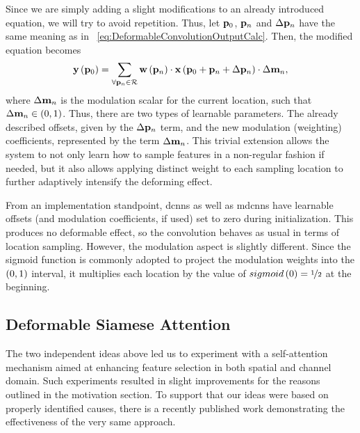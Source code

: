 Since we are simply adding a slight modifications to an already introduced equation, we will try to avoid repetition. Thus, let $\mathbf{p}_0$, $\mathbf{p}_n$ and $\Delta \mathbf{p}_n$ have the same meaning as in \eqtext{}~\ref{eq:DeformableConvolutionOutputCalc}. Then, the modified equation becomes
\begin{equation}
    \label{eq:ModulatedDeformableConvolutionOutputCalc}
    {\mathbf{y}} \left( \mathbf{p}_0 \right) =
    \sum_{\forall \mathbf{p}_n \in \mathcal{R}}
    {\mathbf{w}} \left( \mathbf{p}_n \right) \cdot {\mathbf{x}} \left( \mathbf{p}_0 + \mathbf{p}_n + \Delta \mathbf{p}_n \right) \cdot \Delta \mathbf{m}_n,
\end{equation}
where $\Delta \mathbf{m}_n$ is the modulation scalar for the current location, such that $\Delta \mathbf{m}_n \in \left( {0, 1} \right)$. Thus, there are two types of learnable parameters. The already described offsets, given by the $\Delta \mathbf{p}_n$ term, and the new modulation (weighting) coefficients, represented by the term $\Delta \mathbf{m}_n$. This trivial extension allows the system to not only learn how to sample features in a non-regular fashion if needed, but it also allows applying distinct weight to each sampling location to further adaptively intensify the deforming effect.

From an implementation standpoint, \glspl{dcnn} as well as \glspl{mdcnn} have learnable offsets (and modulation coefficients, if used) set to zero during initialization. This produces no deformable effect, so the convolution behaves as usual in terms of location sampling. However, the modulation aspect is slightly different. Since the sigmoid function is commonly adopted to project the modulation weights into the $\left( {0, 1} \right)$ interval, it multiplies each location by the value of ${sigmoid} \left( 0 \right) = \nicefrac{1}{2}$ at the beginning.

\subsection{Deformable Siamese Attention}
\label{ssec:DeformableSiameseAttention}

The two independent ideas above led us to experiment with a self-attention mechanism aimed at enhancing feature selection in both spatial and channel domain. Such experiments resulted in slight improvements for the reasons outlined in the motivation section. To support that our ideas were based on properly identified causes, there is a recently published work demonstrating the effectiveness of the very same approach.

